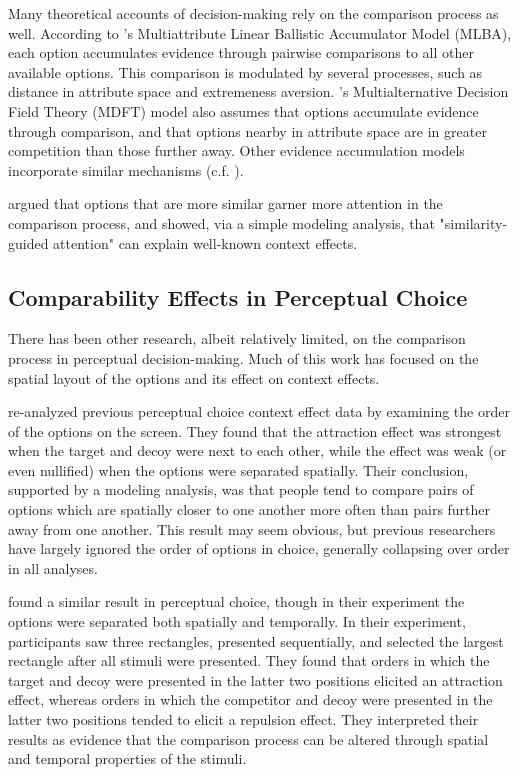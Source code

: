 Many theoretical accounts of decision-making rely on the comparison process as well. According to \textcite{trueblood2014multiattribute}'s Multiattribute Linear Ballistic Accumulator Model (MLBA), each option accumulates evidence through pairwise comparisons to all other available options. This comparison is modulated by several processes, such as distance in attribute space and extremeness aversion. \textcite{roeMultialternativeDecisionField2001a}'s Multialternative Decision Field Theory (MDFT) model also assumes that options accumulate evidence through comparison, and that options nearby in attribute space are in greater competition than those further away. Other evidence accumulation models incorporate similar mechanisms \parencite{usherLossAversionInhibition2004a,noguchiMultialternativeDecisionSampling2018a,wollschlager2NaryChoiceTree2012a,landry2021pairwise} (c.f. \textcite{bhatiaAssociationsAccumulationPreference2013b,bergnerVAMPVotingAgent2019b}). 

\textcite{trueblood2022attentional} argued that options that are more similar garner more attention in the comparison process, and showed, via a simple modeling analysis, that "similarity-guided attention" can explain well-known context effects.

\subsection{Comparability Effects in Perceptual Choice}
There has been other research, albeit relatively limited, on the comparison process in perceptual decision-making. Much of this work has focused on the spatial layout of the options and its effect on context effects.

\textcite{trueblood2022attentional} re-analyzed previous perceptual choice context effect data \parencite{trueblood2015fragile} by examining the order of the options on the screen. They found that the attraction effect was strongest when the target and decoy were next to each other, while the effect was weak (or even nullified) when the options were separated spatially. Their conclusion, supported by a modeling analysis, was that people tend to compare pairs of options which are spatially closer to one another more often than pairs further away from one another. This result may seem obvious, but previous researchers have largely ignored the order of options in choice, generally collapsing over order in all analyses.

\textcite{evansImpactPresentationOrder2021} found a similar result in perceptual choice, though in their experiment the options were separated both spatially and temporally. In their experiment, participants saw three rectangles, presented sequentially, and selected the largest rectangle after all stimuli were presented. They found that orders in which the target and decoy were presented in the latter two positions elicited an attraction effect, whereas orders in which the competitor and decoy were presented in the latter two positions tended to elicit a repulsion effect. They interpreted their results as evidence that the comparison process can be altered through spatial and temporal properties of the stimuli.

